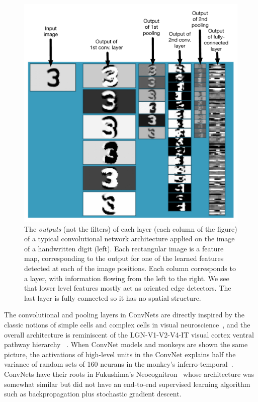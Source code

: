 \documentclass[10pts]{article}
\begin{document}
\begin{figure}[b]
\vspace{-4mm}
\begin{center}
  \includegraphics[width=0.70\linewidth]{convnet-diagram-labeled}
\end{center}
\vspace{-3mm}
\caption{The {\em outputs} (not the filters) of each layer (each column of the figure) 
of a typical convolutional network architecture
applied on the image of a handwritten digit (left). Each rectangular
image is a feature map, corresponding to the output for one of the learned features 
detected at each of the image positions.
Each column corresponds to a layer, with information flowing from the left to
the right. We see that lower level features mostly act as oriented edge detectors.
The last layer is fully connected so it has no spatial structure.
}
\vspace{-2mm}
\label{fig:convnet}
\end{figure}

The convolutional and pooling layers in ConvNets are directly inspired
by the classic notions of simple cells and complex cells in visual
neuroscience~\citep{Hubel62}, and the overall architecture is
reminiscent of the LGN-V1-V2-V4-IT visual cortex ventral pathway
hierarchy ~\citep{Felleman+VanEssen-1991}. When ConvNet models and
monkeys are shown the same picture, the activations of high-level
units in the ConvNet explains half the variance of random sets of 160
neurans in the monkey's
inferro-temporal~\citep{cadieu-plos-2014}. ConvNets have their roots
in Fukushima's Neocognitron~\citep{fukushima-82} whose architecture
was somewhat similar but did not have an end-to-end supervised
learning algorithm such as backpropagation plus stochastic gradient
descent.
\end{document}
